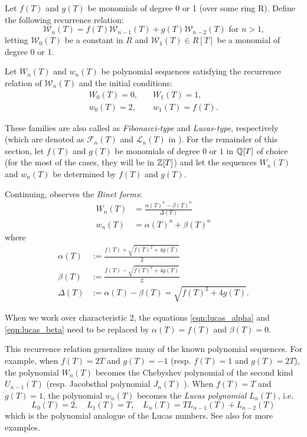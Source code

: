 \begin{definition}\label{lucassq}
    Let $f(T)$ and $g(T)$ be monomials of degree 0 or 1 (over some ring R).
    Define the following recurrence relation:
    \begin{equation}
       \mathcal{W}_n(T) = f(T) \mathcal{W}_{n - 1} (T) + g(T) \mathcal{W}_{n - 2}(T) \text{ for } n > 1 \text{,} \label{eqn:lucas_sequence}
    \end{equation}
    letting $\mathcal{W}_0(T)$ be a constant in $R$ and $\mathcal{W}_1(T) \in R[T]$ be a monomial of degree 0 or 1.
    
    Let $W_n(T)$ and $w_n(T)$ be polynomial sequences satisfying the recurrence relation of $\mathcal{W}_n(T)$ and the initial conditions:
    \begin{align*}
        W_0(T) = 0, &\quad W_1(T) = 1, \\
        w_0(T) = 2, &\quad w_1(T) = f(T) \text{.}
    \end{align*}
\end{definition}
These families are also called as \emph{Fibonacci-type} and \emph{Lucas-type}, respectively (which are denoted as $\mathcal{F}_n(T)$ and $\mathcal{L}_n(T)$ in \cite{florez2019resultant}). For the remainder of this section, let $f(T)$ and $g(T)$ be monomials of degree $0$ or $1$ in $\mathbb{Q}[T]$ of choice (for the most of the cases, they will be in $\mathbb{Z}[T]$) and let the sequences $W_n(T)$ and $w_n(T)$ be determined by $f(T)$ and $g(T)$.

Continuing, \cite{Horadam1996} observes the \emph{Binet forms}:
\begin{align}
    W_n(T) &= \frac{\alpha(T)^n - \beta(T)^n}{\Delta(T)} \label{eqn:Wnbinet} \\
    w_n(T) &= \alpha(T)^n + \beta(T)^n \label{eqn:wnbinet}
\end{align}
where
\begin{align}
    \alpha(T) &:= \frac{f(T) + \sqrt{f(T)^2 + 4 g(T)}}{2} \label{eqn:lucas_alpha} \\
    \beta(T) &:= \frac{f(T) - \sqrt{f(T)^2 + 4 g(T)}}{2} \label{eqn:lucas_beta} \\
    \Delta(T) &:= \alpha(T) - \beta(T) = \sqrt{f(T)^2 + 4 g(T)} \label{eqn:lucas_delta} \text{.}
\end{align}


When we work over characteristic 2, the equations \eqref{eqn:lucas_alpha} and \eqref{eqn:lucas_beta} need to be replaced by $\alpha(T) = f(T)$ and $\beta(T) = 0$.

This recurrence relation generalizes many of the known polynomial sequences.
For example, when $f(T) = 2T$ and $g(T) = -1$ (resp. $f(T) = 1$ and $g(T) = 2T$), the polynomial $W_n(T)$ becomes the Chebyshev polynomial of the second kind $U_{n-1}(T)$ (resp. Jacobsthal polynomial $J_n(T)$ \cite{horadam1997jacobsthal}).
When $f(T) = T$ and $g(T) = 1$, the polynomial $w_n(T)$ becomes the \emph{Lucas polynomial} $L_n(T)$, i.e.
\begin{equation}
    \label{eqn:lucas_poly}
    L_0(T) = 2, \quad L_1(T) = T, \quad L_n(T) = T L_{n-1}(T) + L_{n-2}(T)
\end{equation}
which is the polynomial analogue of the Lucas numbers.
See also \cite[Table 1]{Horadam1996} for more examples.

